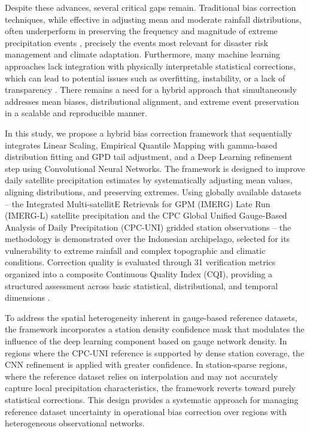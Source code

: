 \documentclass[
]{article}
\begin{document}
Despite these advances, several critical gaps remain. Traditional bias
correction techniques, while effective in adjusting mean and moderate
rainfall distributions, often underperform in preserving the frequency
and magnitude of extreme precipitation events \cite{ref8,ref11}, precisely the
events most relevant for disaster risk management and climate
adaptation. Furthermore, many machine learning approaches lack
integration with physically interpretable statistical corrections, which
can lead to potential issues such as overfitting, instability, or a lack
of transparency \cite{ref12}. There remains a need for a hybrid approach
that simultaneously addresses mean biases, distributional alignment, and
extreme event preservation in a scalable and reproducible manner.

In this study, we propose a hybrid bias correction framework that
sequentially integrates Linear Scaling, Empirical Quantile Mapping with
gamma-based distribution fitting and GPD tail adjustment, and a Deep
Learning refinement step using Convolutional Neural Networks. The
framework is designed to improve daily satellite precipitation estimates
by systematically adjusting mean values, aligning distributions, and
preserving extremes. Using globally available datasets -- the Integrated
Multi-satellitE Retrievals for GPM (IMERG) Late Run (IMERG-L) satellite
precipitation \cite{ref2} and the CPC Global Unified Gauge-Based Analysis of
Daily Precipitation (CPC-UNI) gridded station observations \cite{ref13} --
the methodology is demonstrated over the Indonesian archipelago,
selected for its vulnerability to extreme rainfall and complex
topographic and climatic conditions. Correction quality is evaluated
through 31 verification metrics organized into a composite Continuous
Quality Index (CQI), providing a structured assessment across basic
statistical, distributional, and temporal dimensions \cite{ref14,ref15}.

To address the spatial heterogeneity inherent in gauge-based reference
datasets, the framework incorporates a station density confidence mask
that modulates the influence of the deep learning component based on
gauge network density. In regions where the CPC-UNI reference is
supported by dense station coverage, the CNN refinement is applied with
greater confidence. In station-sparse regions, where the reference
dataset relies on interpolation and may not accurately capture local
precipitation characteristics, the framework reverts toward purely
statistical corrections. This design provides a systematic approach for
managing reference dataset uncertainty in operational bias correction
over regions with heterogeneous observational networks.
\end{document}
